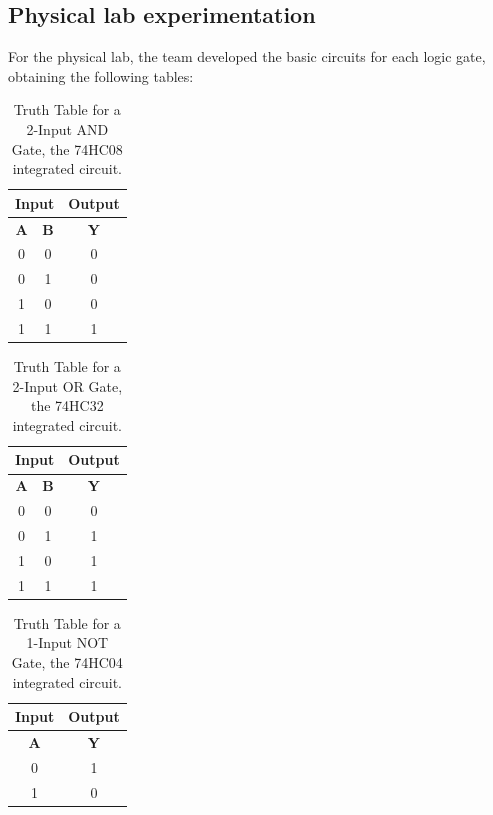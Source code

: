 \documentclass[12pt]{article}  %
\begin{document}
\subsection{Physical lab experimentation}
For the physical lab, the team developed the basic circuits for each logic gate, obtaining the following tables:
\begin{table}[h!]
\centering
\begin{tabular}{|c|c|c|}
\hline
\multicolumn{2}{|c|}{\textbf{Input}} & \textbf{Output} \\
\hline
\textbf{A} & \textbf{B} & \textbf{Y} \\
\hline
0 & 0 & 0 \\
0 & 1 & 0 \\
1 & 0 & 0 \\
1 & 1 & 1 \\
\hline
\end{tabular}
\caption{Truth Table for a 2-Input AND Gate, the 74HC08 integrated circuit.}
\label{tab:and_gate}
\end{table}

\begin{table}[h!]
\centering
\begin{tabular}{|c|c||c|}
\hline
\multicolumn{2}{|c|}{\textbf{Input}} & \textbf{Output} \\
\hline
\textbf{A} & \textbf{B} & \textbf{Y} \\
\hline
0 & 0 & 0 \\
0 & 1 & 1 \\
1 & 0 & 1 \\
1 & 1 & 1 \\
\hline
\end{tabular}
\caption{Truth Table for a 2-Input OR Gate, the 74HC32 integrated circuit.}
\label{tab:or_gate}
\end{table}

\begin{table}[h!]
\centering
\begin{tabular}{|c|c|}
\hline
\textbf{Input} & \textbf{Output} \\
\hline
\textbf{A} & \textbf{Y} \\
\hline
0 & 1  \\
1 & 0  \\
\hline
\end{tabular}
\caption{Truth Table for a 1-Input NOT Gate, the 74HC04 integrated circuit.}
\label{tab:and_gate}
\end{table}
\end{document}
